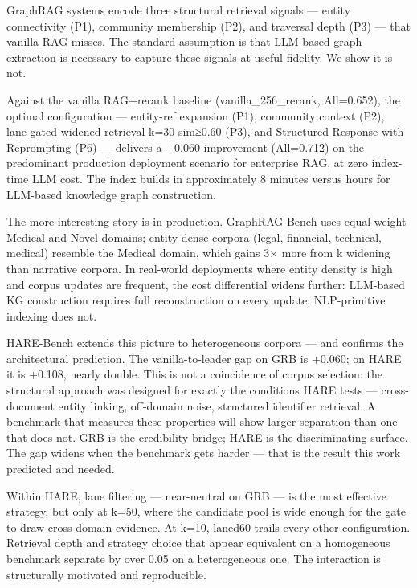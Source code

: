 \documentclass[
]{article}
\begin{document}
GraphRAG systems encode three structural retrieval signals --- entity
connectivity (P1), community membership (P2), and traversal depth (P3)
--- that vanilla RAG misses. The standard assumption is that LLM-based
graph extraction is necessary to capture these signals at useful
fidelity. We show it is not.

Against the vanilla RAG+rerank baseline (vanilla\_256\_rerank,
All=0.652), the optimal configuration --- entity-ref expansion (P1),
community context (P2), lane-gated widened retrieval k=30 sim≥0.60 (P3),
and Structured Response with Reprompting (P6) --- delivers a +0.060
improvement (All=0.712) on the predominant production deployment
scenario for enterprise RAG, at zero index-time LLM cost. The index
builds in approximately 8 minutes versus hours for LLM-based knowledge
graph construction.

The more interesting story is in production. GraphRAG-Bench uses
equal-weight Medical and Novel domains; entity-dense corpora (legal,
financial, technical, medical) resemble the Medical domain, which gains
3× more from k widening than narrative corpora. In real-world
deployments where entity density is high and corpus updates are
frequent, the cost differential widens further: LLM-based KG
construction requires full reconstruction on every update; NLP-primitive
indexing does not.

HARE-Bench extends this picture to heterogeneous corpora --- and
confirms the architectural prediction. The vanilla-to-leader gap on GRB
is +0.060; on HARE it is +0.108, nearly double. This is not a
coincidence of corpus selection: the structural approach was designed
for exactly the conditions HARE tests --- cross-document entity linking,
off-domain noise, structured identifier retrieval. A benchmark that
measures these properties will show larger separation than one that does
not. GRB is the credibility bridge; HARE is the discriminating surface.
The gap widens when the benchmark gets harder --- that is the result
this work predicted and needed.

Within HARE, lane filtering --- near-neutral on GRB --- is the most
effective strategy, but only at k=50, where the candidate pool is wide
enough for the gate to draw cross-domain evidence. At k=10, laned60
trails every other configuration. Retrieval depth and strategy choice
that appear equivalent on a homogeneous benchmark separate by over 0.05
on a heterogeneous one. The interaction is structurally motivated and
reproducible.
\end{document}
